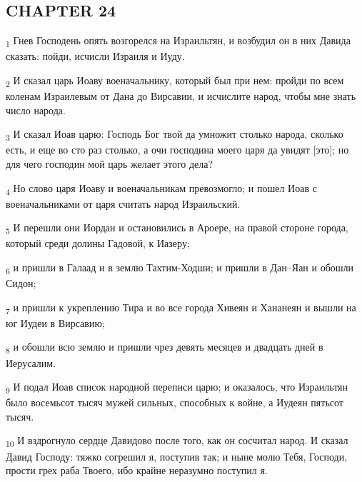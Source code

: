 \subsection{CHAPTER 24}
\begin{tcolorbox}
\textsubscript{1} Гнев Господень опять возгорелся на Израильтян, и возбудил он в них Давида сказать: пойди, исчисли Израиля и Иуду.
\end{tcolorbox}
\begin{tcolorbox}
\textsubscript{2} И сказал царь Иоаву военачальнику, который был при нем: пройди по всем коленам Израилевым от Дана до Вирсавии, и исчислите народ, чтобы мне знать число народа.
\end{tcolorbox}
\begin{tcolorbox}
\textsubscript{3} И сказал Иоав царю: Господь Бог твой да умножит столько народа, сколько есть, и еще во сто раз столько, а очи господина моего царя да увидят [это]; но для чего господин мой царь желает этого дела?
\end{tcolorbox}
\begin{tcolorbox}
\textsubscript{4} Но слово царя Иоаву и военачальникам превозмогло; и пошел Иоав с военачальниками от царя считать народ Израильский.
\end{tcolorbox}
\begin{tcolorbox}
\textsubscript{5} И перешли они Иордан и остановились в Ароере, на правой стороне города, который среди долины Гадовой, к Иазеру;
\end{tcolorbox}
\begin{tcolorbox}
\textsubscript{6} и пришли в Галаад и в землю Тахтим-Ходши; и пришли в Дан--Яан и обошли Сидон;
\end{tcolorbox}
\begin{tcolorbox}
\textsubscript{7} и пришли к укреплению Тира и во все города Хивеян и Хананеян и вышли на юг Иудеи в Вирсавию;
\end{tcolorbox}
\begin{tcolorbox}
\textsubscript{8} и обошли всю землю и пришли чрез девять месяцев и двадцать дней в Иерусалим.
\end{tcolorbox}
\begin{tcolorbox}
\textsubscript{9} И подал Иоав список народной переписи царю; и оказалось, что Израильтян было восемьсот тысяч мужей сильных, способных к войне, а Иудеян пятьсот тысяч.
\end{tcolorbox}
\begin{tcolorbox}
\textsubscript{10} И вздрогнуло сердце Давидово после того, как он сосчитал народ. И сказал Давид Господу: тяжко согрешил я, поступив так; и ныне молю Тебя, Господи, прости грех раба Твоего, ибо крайне неразумно поступил я.
\end{tcolorbox}
